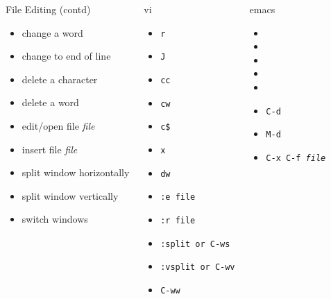 \documentclass[slidestop,mathserif,compress,xcolor=svgnames]{beamer}
\newenvironment{eblock}[0]
{
\begin{beamerboxesrounded}[upper=uppercol2,lower=lowercol2,shadow=true]}
{\end{beamerboxesrounded}}
\begin{document}
\begin{frame}[allowframebreaks]
{\begin{columns}
\begin{eblock}{File Editing (contd)}
\begin{itemize}
      \item change a word
      \item change to end of line
      \item delete a character
      \item delete a word
      \item edit/open file \textit{file}
      \item insert file \textit{file}
      \item split window horizontally
      \item split window vertically
      \item switch windows
    \end{itemize}
    \end{eblock}
     \vspace{-0.5cm}
    \begin{eblock}{vi}
    \begin{itemize}
      \item \texttt{r}
      \item \texttt{J}
      \item \texttt{cc}
      \item \texttt{cw}
      \item \texttt{c\$}
      \item \texttt{x}
      \item \texttt{dw}
      \item \texttt{:e \texttt{file}}
      \item \texttt{:r \texttt{file}}
      \item \texttt{:split or C-ws}
      \item \texttt{:vsplit or C-wv}
      \item \texttt{C-ww}
    \end{itemize}
    \end{eblock}
     \vspace{-0.5cm}
    \begin{eblock}{emacs}
    \begin{itemize}
      \item 
      \item 
      \item 
      \item
      \item
      \item \texttt{C-d}
      \item \texttt{M-d}
      \item \texttt{C-x C-f \textit{file}}

\end{itemize}
\end{eblock}
\end{columns}}
\end{frame}
\end{document}
